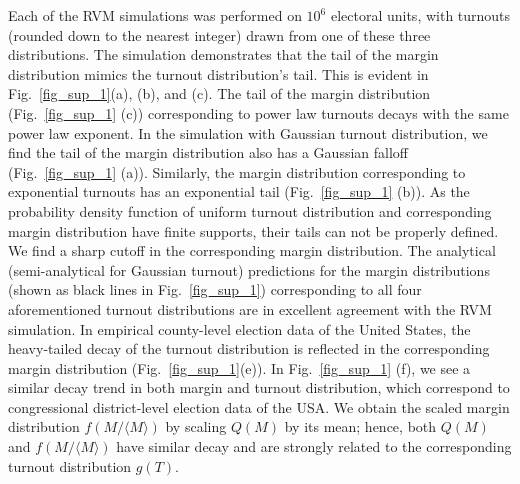 Each of the RVM simulations was performed on $10^6$ electoral units, with turnouts (rounded down to the nearest integer) drawn from one of these three distributions. The simulation demonstrates that the tail of the margin distribution mimics the turnout distribution's tail.  This is evident in Fig.~\ref{fig_sup_1}(a), (b), and (c). The tail of the margin distribution (Fig.~\ref{fig_sup_1} (c)) corresponding to power law turnouts decays with the same power law exponent.  In the simulation with Gaussian turnout distribution, we find the tail of the margin distribution also has a Gaussian falloff (Fig.~\ref{fig_sup_1} (a)). Similarly, the margin distribution corresponding to exponential turnouts has an exponential tail (Fig.~\ref{fig_sup_1} (b)). As the probability density function of uniform turnout distribution and corresponding margin distribution have finite supports, their tails can not be properly defined. We find a sharp cutoff in the corresponding margin distribution. The analytical (semi-analytical for Gaussian turnout) predictions for the margin distributions (shown as black lines in Fig.~\ref{fig_sup_1}) corresponding to all four aforementioned turnout distributions are in excellent agreement with the RVM simulation. In empirical county-level election data of the United States, the heavy-tailed decay of the turnout distribution is reflected in the corresponding margin distribution (Fig.~\ref{fig_sup_1}(e)). In Fig.~\ref{fig_sup_1} (f), we see a similar decay trend in both margin and turnout distribution, which correspond to congressional district-level election data of the USA. We obtain the scaled margin distribution $f(M / \langle M \rangle)$ by scaling $Q(M)$ by its mean; hence, both $Q(M)$ and $f(M / \langle M \rangle)$ have similar decay and are strongly related to the corresponding turnout distribution $g(T)$.
